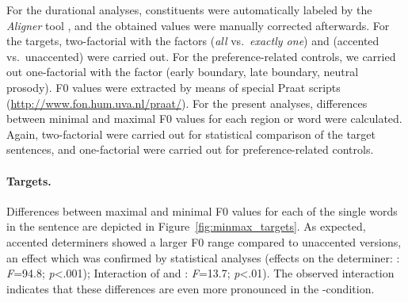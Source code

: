 \documentclass[fleqn,reqno,10pt]{article}
\newcommand{\as}{\acro{as}}
\begin{document}
For the durational analyses, constituents were automatically labeled
by the \emph{Aligner} tool \citep{Rapp98}, and the
obtained values were manually corrected afterwards. For the targets,
two-factorial  with the factors  (\emph{all}
vs.~\emph{exactly one}) and  (accented vs.~unaccented) were
carried out. For the preference-related controls, we carried out
one-factorial  with the factor  (early
boundary, late boundary, neutral prosody). F0 values were extracted by
means of special Praat scripts
(\url{http://www.fon.hum.uva.nl/praat/}). For the present analyses,
differences between minimal and maximal F0 values for each region or
word were calculated. Again, two-factorial  were carried
out for statistical comparison of the target sentences, and one-factorial
 were carried out for preference-related controls.


\paragraph{Targets.} 
Differences between maximal and minimal F0 values for each of the
single words in the sentence are depicted in
Figure~\ref{fig:minmax_targets}. As expected, accented
determiners showed a larger F0 range compared to unaccented versions,
an effect which was confirmed by statistical analyses (effects on
the determiner: : \emph{F}=94.8; \emph{p}<.001); 
Interaction of  and : \emph{F}=13.7; 
\emph{p}<.01). The observed interaction indicates that these differences
are even more pronounced in the \as-condition.
\end{document}
